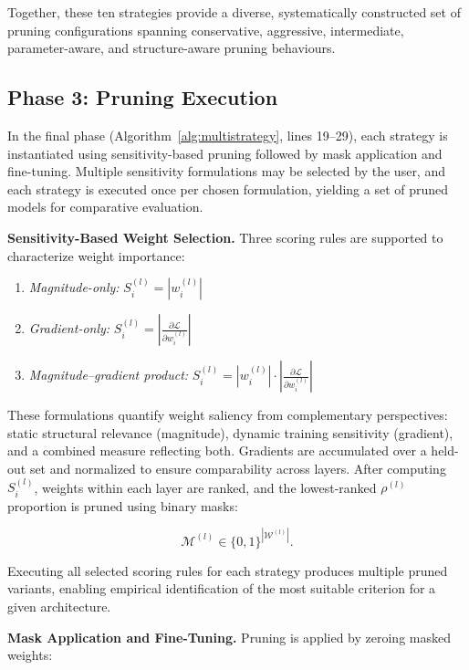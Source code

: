 \documentclass[11pt, conference]{IEEEtran}
\begin{document}
Together, these ten strategies provide a diverse, systematically constructed set of pruning configurations spanning conservative, aggressive, intermediate, parameter-aware, and structure-aware pruning behaviours.

\subsection{Phase 3: Pruning Execution}

In the final phase (Algorithm~\ref{alg:multistrategy}, lines 19--29), each strategy is instantiated using sensitivity-based pruning followed by mask application and fine-tuning. Multiple sensitivity formulations may be selected by the user, and each strategy is executed once per chosen formulation, yielding a set of pruned models for comparative evaluation.

\textbf{Sensitivity-Based Weight Selection.}
Three scoring rules are supported to characterize weight importance:

\begin{enumerate}
    \item \textit{Magnitude-only:} \quad $S_i^{(l)} = |w_i^{(l)}|$
    \item \textit{Gradient-only:} \quad $S_i^{(l)} = \left|\frac{\partial \mathcal{L}}{\partial w_i^{(l)}}\right|$
    \item \textit{Magnitude--gradient product:} \quad $S_i^{(l)} = |w_i^{(l)}| \cdot \left|\frac{\partial \mathcal{L}}{\partial w_i^{(l)}}\right|$
\end{enumerate}

These formulations quantify weight saliency from complementary perspectives: static structural relevance (magnitude), dynamic training sensitivity (gradient), and a combined measure reflecting both. Gradients are accumulated over a held-out set and normalized to ensure comparability across layers. After computing $S_i^{(l)}$, weights within each layer are ranked, and the lowest-ranked $\rho^{(l)}$ proportion is pruned using binary masks:

\begin{equation}
\mathcal{M}^{(l)} \in \{0,1\}^{|\mathcal{W}^{(l)}|}.
\end{equation}

Executing all selected scoring rules for each strategy produces multiple pruned variants, enabling empirical identification of the most suitable criterion for a given architecture.

\textbf{Mask Application and Fine-Tuning.}
Pruning is applied by zeroing masked weights:
\end{document}
